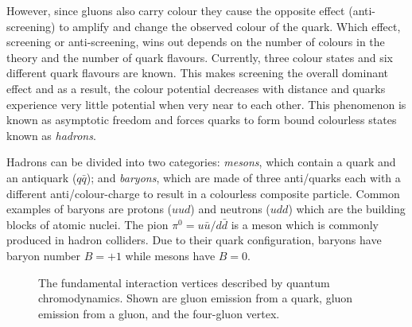 However, since gluons also carry colour they cause the opposite effect (anti-screening) to amplify and change the observed colour of the quark. Which effect, screening or anti-screening, wins out depends on the number of colours in the theory and the number of quark flavours. Currently, three colour states and six different quark flavours are known. This makes screening the overall dominant effect and as a result, the colour potential decreases with distance and quarks experience very little potential when very near to each other. This phenomenon is known as asymptotic freedom and forces quarks to form bound colourless states known as \emph{hadrons}.

Hadrons can be divided into two categories: \emph{mesons}, which contain a quark and an antiquark ($q\bar{q}$); and \emph{baryons}, which are made of three anti/quarks each with a different anti/colour-charge to result in a colourless composite particle. Common examples of baryons are protons ($uud$) and neutrons ($udd$) which are the building blocks of atomic nuclei. The pion $\pi^{0}=u\bar{u}/d\bar{d}$ is a meson which is commonly produced in hadron colliders. Due to their quark configuration, baryons have baryon number $B=+1$ while mesons have $B=0$.
  
\begin{figure}[htbp]
  \centering
    \begin{minipage}[][][t]{.32\textwidth}
      \centering
      
      \label{fig:TheoryQCDColour}
    \end{minipage}
    \begin{minipage}[][][t]{.32\textwidth}
      \centering
        
        \label{fig:TheoryQCDThreeGluon}
    \end{minipage}
    \begin{minipage}[][][t]{.32\textwidth}
      \centering
        
        \label{fig:TheoryQCDFourGluon}
    \end{minipage}  
    \caption[The fundamental interaction vertices described by quantum chromodynamics.]{The fundamental interaction vertices described by quantum chromodynamics. Shown are  gluon emission from a quark,  gluon emission from a gluon, and  the four-gluon vertex.}\label{fig:TheoryQCDVertexes}
\end{figure}

